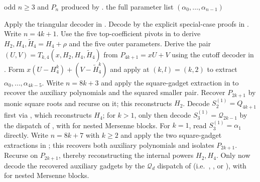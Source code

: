 \begin{algorithm}[H]
  \caption{Final decoder for $P_n$ (structural recursion)}\label{alg:final-decoder}
  \begin{algorithmic}
    \Require odd $n\ge 3$ and $P_n$ produced by .
    \Ensure the full parameter list $(\alpha_0,\ldots,\alpha_{n-1})$

      \State Apply the triangular decoder in .
      \State Decode by the explicit special-case proofs in .
      \State Write $n=4k+1$.
      \State Use the five top-coefficient pivots in  to derive $H_2,H_4,\tilde H_4=H_4+\rho$ and the five outer parameters.
      \State Derive the pair $(U,V)=T_{k,4}(x,H_2,H_4,\tilde H_4)$ from $P_{4k+1}=xU+V$ using the cutoff decoder in .
      \State Form $x(U-H_4^k)+(V-\tilde H_4^k)$ and apply  at $(k,l)=(k,2)$ to extract $\alpha_0,\ldots,\alpha_{4k-5}$.
      \State Write $n=8k+3$ and apply the square-gadget extraction in  to recover the auxiliary polynomials and the squared smaller pair.
      \State Recover $P_{2k+1}$ by monic square roots and recurse on it; this reconstructs $H_2$.
      \State Decode $S^{(1)}_2=Q_{4k+1}$ first via , which reconstructs $H_4$; for $k>1$, only then decode $S^{(1)}_3=\mathcal Q_{2k-1}$ by the dispatch of , with  for nested Mersenne blocks.  For $k=1$, read $S^{(1)}_3=\alpha_1$ directly.
    \Else
      \State Write $n=8k+7$ with $k\ge 2$ and apply the two square-gadget extractions in ; this recovers both auxiliary polynomials and isolates $P_{2k+1}$.
      \State Recurse on $P_{2k+1}$, thereby reconstructing the internal powers $H_2,H_4$.
      \State Only now decode the recovered auxiliary gadgets by the $\mathcal Q_d$ dispatch of  (i.e.\ , , or ), with  for nested Mersenne blocks.
    \EndIf
  \end{algorithmic}
\end{algorithm}

